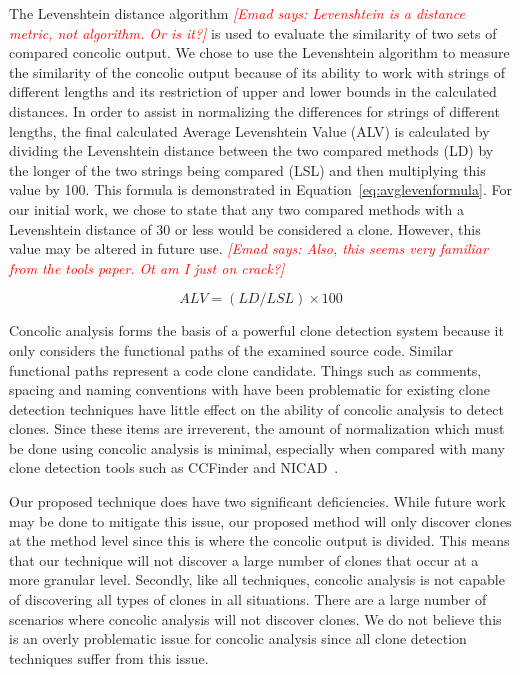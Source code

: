 \documentclass{sig-alternate}
\newcommand{\emad}[1]{\textcolor{red}{{\it [Emad says: #1]}}}
\begin{document}
The Levenshtein distance algorithm \emad{Levenshtein is a distance metric, not algorithm. Or is it?} is used to evaluate the similarity of two sets of compared concolic output. We chose to use the Levenshtein algorithm to measure the similarity of the concolic output because of its ability to work with strings of different lengths and its restriction of upper and lower bounds in the calculated distances. In order to assist in normalizing the differences for strings of different lengths, the final calculated Average Levenshtein Value (ALV) is calculated by dividing the Levenshtein distance between the two compared methods (LD) by the longer of the two strings being compared (LSL) and then multiplying this value by 100. This formula is demonstrated in Equation~\ref{eq:avglevenformula}. For our initial work, we chose to state that any two compared methods with a Levenshtein distance of 30 or less would be considered a clone. However, this value may be altered in future use. \emad{Also, this seems very familiar from the tools paper. Ot am I just on crack?}

\begin{equation} \label{eq:avglevenformula}
ALV = (LD/LSL) \times 100
\end{equation}

Concolic analysis forms the basis of a powerful clone detection system because it only considers the functional paths of the examined source code. Similar functional paths represent a code clone candidate. Things such as comments, spacing and naming conventions with have been problematic for existing clone detection techniques have little effect on the ability of concolic analysis to detect clones. Since these items are irreverent, the amount of normalization which must be done using concolic analysis is minimal, especially when compared with many clone detection tools such as CCFinder and NICAD~\cite{Roy:2009:CEC:1530898.1531101}.



Our proposed technique does have two significant deficiencies. While future work may be done to mitigate this issue, our proposed method will only discover clones at the method level since this is where the concolic output is divided. This means that our technique will not discover a large number of clones that occur at a more granular level. Secondly, like all techniques, concolic analysis is not capable of discovering all types of clones in all situations. There are a large number of scenarios where concolic analysis will not discover clones. We do not believe this is an overly problematic issue for concolic analysis since all clone detection techniques suffer from this issue.
\end{document}
